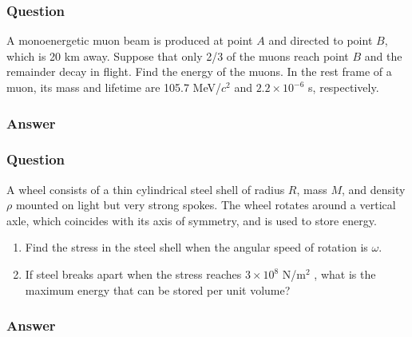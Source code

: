 \subsubsection{Question}

A monoenergetic muon beam is produced at point $A$ and directed to point $B$, which is 20 km away. Suppose that only 2/3 of the muons reach point $B$ and the remainder decay in flight. Find the energy of the muons. In the rest frame of a muon, its mass and lifetime are 105.7 MeV/$c^2$ and $2.2\times10^{-6}$ s, respectively.

\subsubsection{Answer}


\subsubsection{Question}
A wheel consists of a thin cylindrical steel shell of radius $R$, mass $M$, and density $\rho$ mounted on light but very strong spokes. The wheel rotates around a vertical axle, which coincides with its axis of symmetry, and is used to store energy.
\begin{enumerate}
	\item Find the stress in the steel shell when the angular speed of rotation is $\omega$.
	\item If steel breaks apart when the stress reaches $3\times10^8$ N/m$^2$ , what is the maximum energy that can be stored per unit volume?
\end{enumerate}

\subsubsection{Answer}



